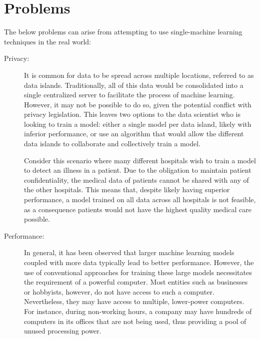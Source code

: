 \section{Problems} \label{problems}
The below problems can arise from attempting to use single-machine learning techniques in the real world:
\begin{description}
	\item[Privacy:] It is common for data to be spread across multiple locations, referred to as data islands. Traditionally, all of this data would be consolidated into a single centralized server to facilitate the process of machine learning. However, it may not be possible to do so, given the potential conflict with privacy legislation. This leaves two options to the data scientist who is looking to train a model: either a single model per data island, likely with inferior performance, or use an algorithm that would allow the different data islands to collaborate and collectively train a model.
	
	Consider this scenario where many different hospitals wish to train a model to detect an illness in a patient. Due to the obligation to maintain patient confidentiality, the medical data of patients cannot be shared with any of the other hospitals. This means that, despite likely having superior performance, a model trained on all data across all hospitals is not feasible, as a consequence patients would not have the highest quality medical care possible.
	
	\item[Performance:] In general, it has been observed that larger machine learning models coupled with more data typically lead to better performance. However, the use of conventional approaches for training these large models necessitates the requirement of a powerful computer. Most entities such as businesses or hobbyists, however, do not have access to such a computer. Nevertheless, they may have access to multiple, lower-power computers. For instance, during non-working hours, a company may have hundreds of computers in its offices that are not being used, thus providing a pool of unused processing power.
\end{description}

